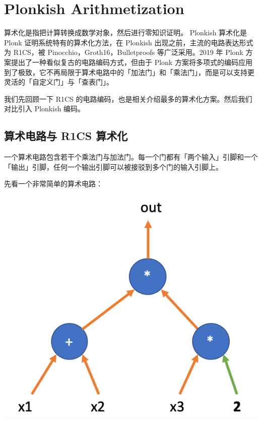 \chapter{Plonkish Arithmetization}\label{ux7406ux89e3-plonkux4e00plonkish-arithmetization}


算术化是指把计算转换成数学对象，然后进行零知识证明。 Plonkish 算术化是
Plonk 证明系统特有的算术化方法，在 Plonkish
出现之前，主流的电路表达形式为 R1CS，被 Pinocchio，Groth16，Bulletproofs
等广泛采用。2019 年 Plonk 方案\cite{Plonk}提出了一种看似复古的电路编码方式，但由于
Plonk
方案将多项式的编码应用到了极致，它不再局限于算术电路中的「加法门」和「乘法门」，而是可以支持更灵活的「自定义门」与「查表门」。

我们先回顾一下 R1CS
的电路编码，也是相关介绍最多的算术化方案。然后我们对比引入 Plonkish
编码。

\hypertarget{ux7b97ux672fux7535ux8defux4e0e-r1cs-ux7b97ux672fux5316}{%
\section{算术电路与 R1CS
算术化}\label{ux7b97ux672fux7535ux8defux4e0e-r1cs-ux7b97ux672fux5316}}

一个算术电路包含若干个乘法门与加法门。每一个门都有「两个输入」引脚和一个「输出」引脚，任何一个输出引脚可以被接驳到多个门的输入引脚上。

先看一个非常简单的算术电路：


\includegraphics[scale=0.3]{img/img20230414162317.png}


